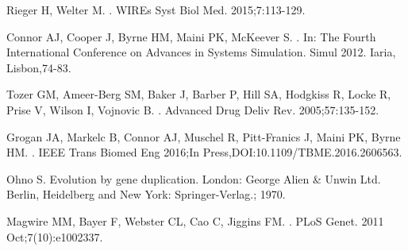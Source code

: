 \documentclass[10pt,letterpaper]{article}
\begin{document}
\begin{thebibliography}{10}
Rieger H, Welter M.
.
\newblock WIREs Syst Biol Med. 2015;7:113-129.

Connor AJ, Cooper J, Byrne HM, Maini PK, McKeever S.
.
\newblock In: The Fourth International Conference on Advances in Systems Simulation. Simul 2012. Iaria, Lisbon,74-83.

Tozer GM, Ameer-Berg SM, Baker J, Barber P, Hill SA, Hodgkiss R, Locke R, Prise V, Wilson I, Vojnovic B.
.
\newblock Advanced Drug Deliv Rev. 2005;57:135-152.

Grogan JA, Markelc B, Connor AJ, Muschel R, Pitt-Franics J, Maini PK, Byrne HM.
.
\newblock IEEE Trans Biomed Eng 2016;In Press,DOI:10.1109/TBME.2016.2606563.

Ohno S.
\newblock Evolution by gene duplication.
\newblock London: George Alien \& Unwin Ltd. Berlin, Heidelberg and New York:
  Springer-Verlag.; 1970.

Magwire MM, Bayer F, Webster CL, Cao C, Jiggins FM.
.
\newblock PLoS Genet. 2011 Oct;7(10):e1002337.

\end{thebibliography}
\end{document}
